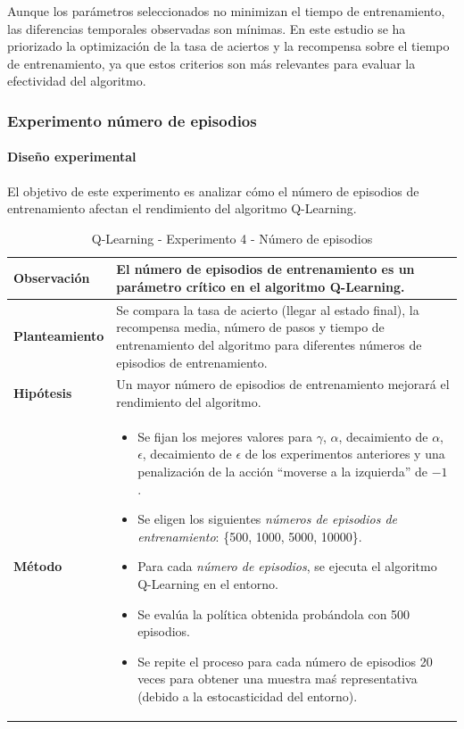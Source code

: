 Aunque los parámetros seleccionados no minimizan el tiempo de entrenamiento, las diferencias temporales observadas son mínimas. En este estudio se ha priorizado la optimización de la tasa de aciertos y la recompensa sobre el tiempo de entrenamiento, ya que estos criterios son más relevantes para evaluar la efectividad del algoritmo.

\subsubsection{Experimento número de episodios}

\paragraph{Diseño experimental}
El objetivo de este experimento es analizar cómo el número de episodios de entrenamiento afectan el rendimiento del algoritmo Q-Learning.
\begin{table}[H]
    \centering
    \begin{tabularx}{\textwidth}{|p{4cm}|X|} %
        \hline %
        \textbf{Observación} & El número de episodios de entrenamiento es un parámetro crítico en el algoritmo Q-Learning.
        \\ \hline
        \textbf{Planteamiento} & Se compara la tasa de acierto (llegar al estado final), la recompensa media, número de pasos y tiempo de entrenamiento del algoritmo para diferentes números de episodios de entrenamiento.
        \\ \hline
        \textbf{Hipótesis} & Un mayor número de episodios de entrenamiento mejorará el rendimiento del algoritmo.
        \\ \hline
        \textbf{Método} &
        \begin{itemize}
            \item Se fijan los mejores valores para \(\gamma\), \(\alpha\), decaimiento de \(\alpha\), \(\epsilon\), decaimiento de \(\epsilon\) de los experimentos anteriores y una penalización de la acción ``moverse a la izquierda'' de $-1$.
            \item Se eligen los siguientes \textit{números de episodios de entrenamiento}: \{500, 1000, 5000, 10000\}.
            \item Para cada \textit{número de episodios}, se ejecuta el algoritmo Q-Learning en el entorno.
            \item Se evalúa la política obtenida probándola con 500 episodios.
            \item Se repite el proceso para cada número de episodios 20 veces para obtener una muestra maś representativa (debido a la estocasticidad del entorno).
        \end{itemize}
        \\ \hline
    \end{tabularx}
    \caption{Q-Learning - Experimento 4 - Número de episodios}
    \label{tab:diseñoQLEarningExp3}
\end{table}


